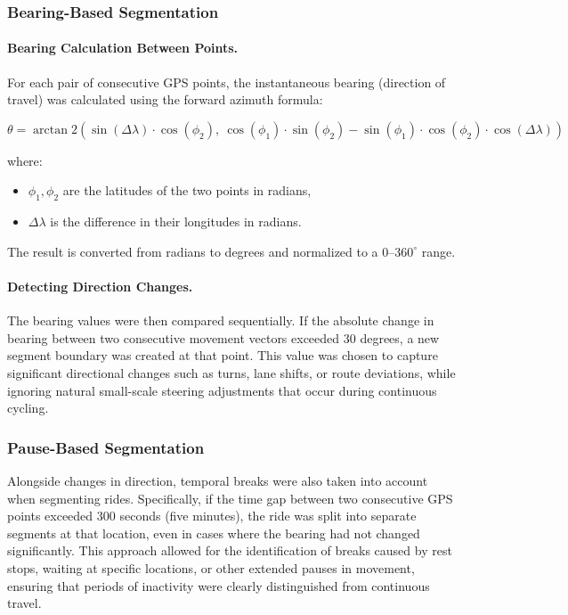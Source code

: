 \subsubsection{Bearing-Based Segmentation}
\paragraph{Bearing Calculation Between Points.}
For each pair of consecutive GPS points, the instantaneous bearing (direction of travel) was calculated using the forward azimuth formula:

\begin{equation}
\theta = \arctan2\left( 
\sin(\Delta\lambda) \cdot \cos(\phi_2),\ 
\cos(\phi_1) \cdot \sin(\phi_2) - \sin(\phi_1) \cdot \cos(\phi_2) \cdot \cos(\Delta\lambda)
\right)
\end{equation}

where:
\begin{itemize}
    \item $\phi_1, \phi_2$ are the latitudes of the two points in radians,
    \item $\Delta\lambda$ is the difference in their longitudes in radians.
\end{itemize}

The result is converted from radians to degrees and normalized to a $0$–$360^\circ$ range.


\paragraph{Detecting Direction Changes.}
The bearing values were then compared sequentially. If the absolute change in bearing between two consecutive movement vectors exceeded 30 degrees, a new segment boundary was created at that point. This value was chosen to capture significant directional changes such as turns, lane shifts, or route deviations, while ignoring natural small-scale steering adjustments that occur during continuous cycling.

\subsubsection{Pause-Based Segmentation}
Alongside changes in direction, temporal breaks were also taken into account when segmenting rides. Specifically, if the time gap between two consecutive GPS points exceeded 300 seconds (five minutes), the ride was split into separate segments at that location, even in cases where the bearing had not changed significantly. This approach allowed for the identification of breaks caused by rest stops, waiting at specific locations, or other extended pauses in movement, ensuring that periods of inactivity were clearly distinguished from continuous travel.

